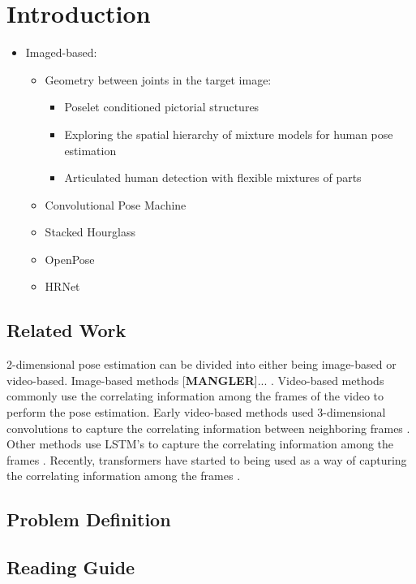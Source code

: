 \documentclass[./main.tex]{subfiles}
\begin{document}
\section{Introduction}

\begin{itemize}
    \item Imaged-based:
    \begin{itemize}
        \item Geometry between joints in the target image:
        \begin{itemize}
            \item Poselet conditioned pictorial structures
            \item Exploring the spatial hierarchy of mixture models for human pose estimation
            \item  Articulated human detection with flexible mixtures of parts
        \end{itemize}
        \item Convolutional Pose Machine
        \item Stacked Hourglass
        \item OpenPose
        \item HRNet
    \end{itemize}
\end{itemize}

\subsection{Related Work}
2-dimensional pose estimation can be divided into either being image-based or video-based. Image-based methods [\textbf{MANGLER}]... . Video-based methods commonly use the correlating information among the frames of the video to perform the pose estimation. Early video-based methods used 3-dimensional convolutions to capture the correlating information between neighboring frames \cite{https://doi.org/10.48550/arxiv.1506.02897, https://doi.org/10.48550/arxiv.1712.09184}. Other methods use LSTM's \cite{HochSchm97} to capture the correlating information among the frames \cite{https://doi.org/10.48550/arxiv.1712.06316, https://doi.org/10.48550/arxiv.2001.08095}. Recently, transformers \cite{https://doi.org/10.48550/arxiv.1706.03762} have started to being used as a way of capturing the correlating information among the frames \cite{https://doi.org/10.48550/arxiv.2203.08713}.

\subsection{Problem Definition}

\subsection{Reading Guide}
\end{document}
